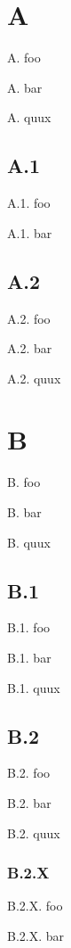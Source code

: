 \documentclass[11pt]{article}
\begin{document}
    \section{A}

    A. foo

    A. bar

    A. quux

    \subsection{A.1}

    A.1. foo

    A.1. bar

    \subsection{A.2}

    A.2. foo

    A.2. bar

    A.2. quux

    \section{B}

    B. foo

    B. bar

    B. quux

    \subsection{B.1}

    B.1. foo

    B.1. bar

    B.1. quux

    \subsection{B.2}

    B.2. foo

    B.2. bar

    B.2. quux

    \subsubsection{B.2.X}

    B.2.X. foo

    B.2.X. bar
\end{document}
